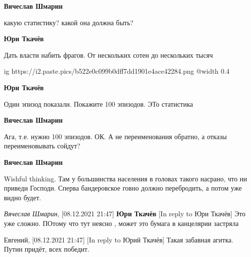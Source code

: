 \begin{itemize}
\textbf{Вячеслав Шмарин}

какую статистику? какой она должна быть?

\textbf{Юри Ткачёв}

Дать власти набить фрагов. От нескольких сотен до нескольких тысяч

\ifcmt
  ig https://i2.paste.pics/b522e0c099b0dff7dd1901e4ace42284.png
  @width 0.4
\fi

\textbf{Юри Ткачёв}

Один эпизод показали. Покажите 100 эпизодов. ЭТо статистика

\textbf{Вячеслав Шмарин}

Ага, т.е. нужно 100 эпизодов. ОК. А не переименования обратно, а отказы переименовывать сойдут?

\textbf{Вячеслав Шмарин}

Wishful thinking. Там у большинства населения в головах такого насрано, что ни
приведи Господи. Сперва бандеровское говно должно перебродить, а потом уже
видно будет.

\emph{Вячеслав Шмарин}, [08.12.2021 21:47]
\textbf{Юри Ткачёв}
[In reply to Юри Ткачёв]
Это уже сложно. ПОтому что тут неясно , может это бумага в канцелярии застряла

Евгений, [08.12.2021 21:47]
[In reply to Юрий Ткачёв]
Такая забавная агитка. Путин придёт, всех победит.

\end{itemize} %
